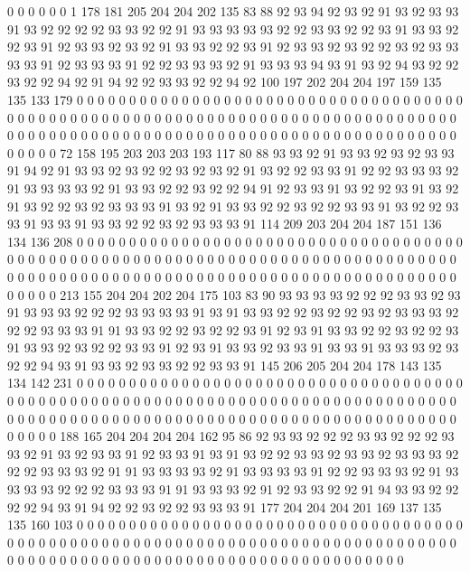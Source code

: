 0 0 0 0 0 0 1 178 181 205 204 204 202 135 83 88 92 93 94 92
93 92 91 93 92 93 93 91 93 92 92 92 92 93 93 92 92 91 93 93
93 93 93 92 92 93 93 92 92 93 91 93 93 92 92 93 91 92 93 93
92 93 92 91 93 93 92 92 93 91 92 93 93 92 93 92 92 93 92 93
93 93 93 91 92 93 93 93 91 92 92 93 93 93 92 91 93 93 93 94
93 91 93 92 94 93 92 92 93 92 92 94 92 91 94 92 92 93 93 92
92 94 92 100 197 202 204 204 197 159 135 135 133 179 0 0 0 0 0 0
0 0 0 0 0 0 0 0 0 0 0 0 0 0 0 0 0 0 0 0
0 0 0 0 0 0 0 0 0 0 0 0 0 0 0 0 0 0 0 0
0 0 0 0 0 0 0 0 0 0 0 0 0 0 0 0 0 0 0 0
0 0 0 0 0 0 0 0 0 0 0 0 0 0 0 0 0 0 0 0
0 0 0 0 0 0 0 0 0 0 0 0 0 0 0 0 0 0 0 0
0 0 0 0 0 0 0 0 0 0 0 0 0 0 0 0 0 0 0 0
0 0 72 158 195 203 203 203 193 117 80 88 93 93 92 91 93 93 92 93
92 93 93 91 94 92 91 93 93 92 93 92 92 93 92 93 92 91 93 92
92 93 93 91 92 92 93 93 93 92 91 93 93 93 93 92 91 93 93 92
92 93 92 92 94 91 92 93 93 91 93 92 92 93 91 93 92 91 93 92
92 93 92 93 93 93 91 93 92 91 93 93 92 92 93 92 92 93 93 91
93 92 92 93 93 91 93 93 91 93 93 92 92 93 92 93 93 93 91 114
209 203 204 204 187 151 136 134 136 208 0 0 0 0 0 0 0 0 0 0
0 0 0 0 0 0 0 0 0 0 0 0 0 0 0 0 0 0 0 0
0 0 0 0 0 0 0 0 0 0 0 0 0 0 0 0 0 0 0 0
0 0 0 0 0 0 0 0 0 0 0 0 0 0 0 0 0 0 0 0
0 0 0 0 0 0 0 0 0 0 0 0 0 0 0 0 0 0 0 0
0 0 0 0 0 0 0 0 0 0 0 0 0 0 0 0 0 0 0 0
0 0 0 0 0 0 0 0 0 0 0 0 0 0 0 0 0 0 213 155
204 204 202 204 175 103 83 90 93 93 93 93 92 92 92 93 93 92 93 91
93 93 93 92 92 92 93 93 93 93 91 93 91 93 93 92 92 93 92 92
93 92 93 93 93 92 92 92 93 93 93 91 91 93 93 92 92 93 92 92
93 91 92 93 91 93 93 92 92 93 92 92 93 91 93 93 92 93 92 92
93 93 91 92 93 91 93 93 92 93 93 91 93 93 91 93 93 93 92 93
92 92 94 93 91 93 93 92 93 93 92 92 93 93 91 145 206 205 204 204
178 143 135 134 142 231 0 0 0 0 0 0 0 0 0 0 0 0 0 0
0 0 0 0 0 0 0 0 0 0 0 0 0 0 0 0 0 0 0 0
0 0 0 0 0 0 0 0 0 0 0 0 0 0 0 0 0 0 0 0
0 0 0 0 0 0 0 0 0 0 0 0 0 0 0 0 0 0 0 0
0 0 0 0 0 0 0 0 0 0 0 0 0 0 0 0 0 0 0 0
0 0 0 0 0 0 0 0 0 0 0 0 0 0 0 0 0 0 0 0
0 0 0 0 0 0 0 0 0 0 0 0 0 0 188 165 204 204 204 204
162 95 86 92 93 93 92 92 92 93 93 92 92 92 93 93 92 91 93 92
93 93 91 92 93 93 91 93 91 93 92 92 93 93 92 93 93 92 93 93
93 92 92 92 93 93 93 92 91 91 93 93 93 93 92 91 93 93 93 93
91 92 92 93 93 93 92 91 93 93 93 93 92 92 92 93 93 93 91 91
93 93 93 92 91 92 93 93 92 92 91 94 93 93 92 92 92 92 94 93
91 94 92 92 93 92 92 93 93 93 91 177 204 204 204 201 169 137 135 135
160 103 0 0 0 0 0 0 0 0 0 0 0 0 0 0 0 0 0 0
0 0 0 0 0 0 0 0 0 0 0 0 0 0 0 0 0 0 0 0
0 0 0 0 0 0 0 0 0 0 0 0 0 0 0 0 0 0 0 0
0 0 0 0 0 0 0 0 0 0 0 0 0 0 0 0 0 0 0 0
0 0 0 0 0 0 0 0 0 0 0 0 0 0 0 0 0 0 0 0
0 0 0 0 0 0 0 0 0 0 0 0 0 0 0 0 0 0 0 0
